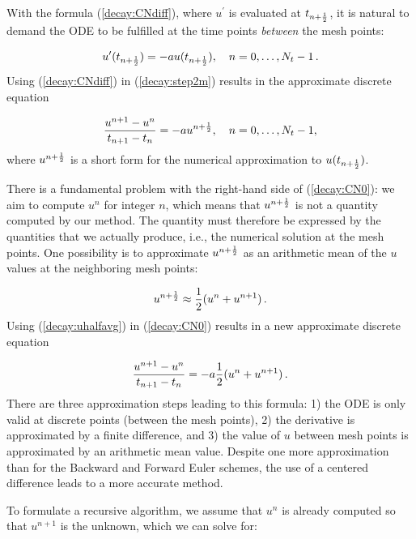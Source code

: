 \documentclass[%
oneside,                 %
final,                   %
10pt]{article}
\begin{document}
With the formula (\ref{decay:CNdiff}), where $u^{\prime}$ is evaluated at
$t_{n+\frac{1}{2}}$, it is natural to demand the
ODE to be fulfilled at the time points \emph{between} the mesh points:

\begin{equation}
u^{\prime}(t_{n+\frac{1}{2}}) = -au(t_{n+\frac{1}{2}}),\quad n=0,
\ldots,N_t-1\thinspace .
\label{decay:step2m}
\end{equation}
Using (\ref{decay:CNdiff}) in (\ref{decay:step2m}) results in
the approximate discrete equation

\begin{equation}
\frac{u^{n+1}-u^n}{t_{n+1}-t_n} = -au^{n+\frac{1}{2}},\quad n=0,\ldots,N_t-1,
\label{decay:CN0}
\end{equation}
where $u^{n+\frac{1}{2}}$ is a short form for the numerical approximation
to $u(t_{n+\frac{1}{2}})$.

There is a fundamental problem with the right-hand side of
(\ref{decay:CN0}): we aim to compute $u^n$ for integer $n$, which means
that $u^{n+\frac{1}{2}}$ is not a quantity computed by our method. The
quantity must
therefore be
expressed by the quantities that we actually produce, i.e.,
the numerical solution at the
mesh points. One possibility is to approximate $u^{n+\frac{1}{2}}$
as an arithmetic mean of the $u$ values at the neighboring mesh points:


\begin{equation}
u^{n+\frac{1}{2}} \approx \frac{1}{2} (u^n + u^{n+1})\thinspace .
\label{decay:uhalfavg}
\end{equation}
Using (\ref{decay:uhalfavg}) in (\ref{decay:CN0}) results in a new
approximate discrete equation

\begin{equation}
\frac{u^{n+1}-u^n}{t_{n+1}-t_n} = -a\frac{1}{2} (u^n + u^{n+1})\thinspace .
\label{decay:CN1}
\end{equation}
There are three approximation steps leading to this formula:
1) the ODE is only valid at discrete points (between the mesh points),
2) the derivative is approximated by a finite difference, and 3) the
value of $u$ between mesh points is approximated by an arithmetic mean
value. Despite one more approximation than for the Backward and Forward
Euler schemes, the use of a centered difference leads to a more
accurate method.

To formulate a recursive algorithm,
we assume that $u^n$ is already computed so that $u^{n+1}$ is the
unknown, which we can solve for:
\end{document}
